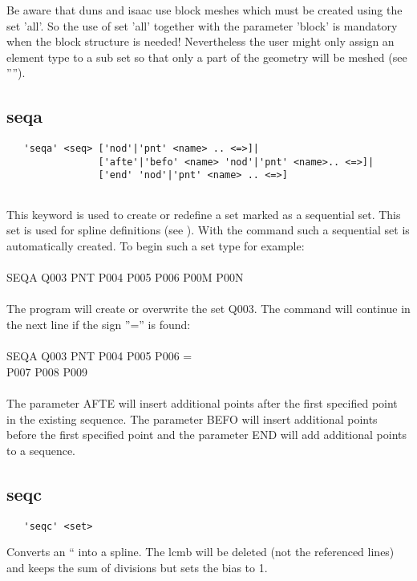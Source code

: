 \documentclass{article}
\begin{document}
Be aware that duns and isaac use block meshes which must be created using the set 'all'. So the use of set 'all' together with the parameter 'block' is mandatory when the block structure is needed! Nevertheless the user might only assign an element type to a sub set so that only a part of the geometry will be meshed (see '''').


\subsection{\label{seqa}seqa}
\begin{verbatim}
   'seqa' <seq> ['nod'|'pnt' <name> .. <=>]|
                ['afte'|'befo' <name> 'nod'|'pnt' <name>.. <=>]|
                ['end' 'nod'|'pnt' <name> .. <=>]
                 
\end{verbatim}
This keyword is used to create or redefine a set marked as a sequential set. This set is used for spline definitions (see ). With the command  such a sequential set is automatically created. To begin such a set type for example:\\\\SEQA  Q003     PNT  P004 P005 P006 P00M P00N\\\\The program will create or overwrite the set Q003. The command will continue in the next line if the sign ''='' is found:\\\\SEQA  Q003     PNT  P004 P005 P006 =\\                    P007 P008 P009\\\\The parameter AFTE will insert additional points after the first specified point in the existing sequence. The parameter BEFO will insert additional points before the first specified point and the parameter END will add additional points to a sequence.

\subsection{\label{seqc}seqc}
\begin{verbatim}
   'seqc' <set>
\end{verbatim}
Converts an `` into a spline. The lcmb will be deleted (not the referenced lines) and keeps the sum of divisions but sets the bias to 1.
\end{document}
